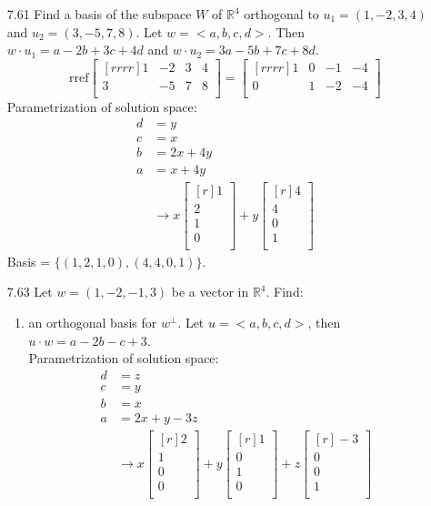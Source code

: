 \documentclass[12pt]{article}
\theoremstyle{definition}
\theoremstyle{plain}
\begin{document}
\begin{enumerate}
\item[7.61]Find a basis of the subspace $W$ of $\mathbb{R}^4$ orthogonal to $u_1=(1,-2,3,4)$ and $u_2=(3,-5,7,8)$.
	Let $w=<a,b,c,d>$. Then $w\cdot u_1 = a-2b+3c+4d$ and $w\cdot u_2=3a-5b+7c+8d$.\\
	\[ \mathrm{rref}\begin{bmatrix}[rrrr]1&-2&3&4\\3&-5&7&8\\\end{bmatrix} = \begin{bmatrix}[rrrr]1&0&-1&-4\\0&1&-2&-4\\\end{bmatrix} \]
	Parametrization of solution space:\\
	\begin{align*}
	d&=y\\
	c&=x\\
	b&=2x+4y\\
	a&=x+4y\\
	&\rightarrow x\begin{bmatrix}[r]1\\2\\1\\0\\\end{bmatrix} + y\begin{bmatrix}[r]4\\4\\0\\1\\\end{bmatrix}
	\end{align*}
	Basis = $\{(1,2,1,0),(4,4,0,1)\}$.
\item[7.63]Let $w=(1,-2,-1,3)$ be a vector in $\mathbb{R}^4$. Find:
	\begin{enumerate}
	\item an orthogonal basis for $w^\perp$.
		Let $u=<a,b,c,d>$, then $u\cdot w = a-2b-c+3$.\\
		Parametrization of solution space:
		\begin{align*}
		d&=z\\
		c&=y\\
		b&=x\\
		a&=2x+y-3z\\
		&\rightarrow x\begin{bmatrix}[r]2\\1\\0\\0\\\end{bmatrix}+y\begin{bmatrix}[r]1\\0\\1\\0\\\end{bmatrix}+z\begin{bmatrix}[r]-3\\0\\0\\1\\\end{bmatrix}

\end{align*}
\end{enumerate}
\end{enumerate}
\end{document}
